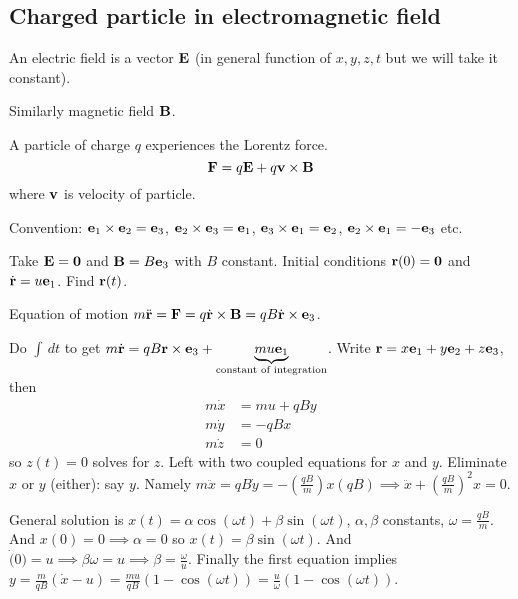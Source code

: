 \documentclass[10pt, a4paper]{article}
\begin{document}
\section{}


\subsection{Charged particle in electromagnetic field}

\begin{definition}
    An electric field is a vector $\mathbf{E}$
    (in general function of $x, y, z, t$ but we will take it constant).
\end{definition}

Similarly magnetic field $\mathbf{B}$.

A particle of charge $q$ experiences the Lorentz force.
\[
\mathbf{F} = q\mathbf{E} + q\mathbf{v} \times \mathbf{B}
\]
where $\mathbf{v}$ is velocity of particle.

Convention:
$\mathbf{e}_1 \times \mathbf{e}_2 = \mathbf{e}_3$,
$\mathbf{e}_2 \times \mathbf{e}_3 = \mathbf{e}_1$,
$\mathbf{e}_3 \times \mathbf{e}_1 = \mathbf{e}_2$,
$\mathbf{e}_2 \times \mathbf{e}_1 = -\mathbf{e}_3$ etc.

\begin{example}
    Take $\mathbf{E} = \mathbf{0}$ and $\mathbf{B} = B\mathbf{e}_3$ with $B$ constant.
    Initial conditions $\mathbf{r}(0) = \mathbf{0}$ and $\dot{\mathbf{r}} = u\mathbf{e}_1$.
    Find $\mathbf{r}(t)$.

    \begin{solution}
        Equation of motion $m\ddot{\mathbf{r}} = \mathbf{F} = q\dot{\mathbf{r}} \times \mathbf{B} = qB \dot{\mathbf{r}} \times \mathbf{e}_3$.

        Do $\int\,dt$ to get $m\dot{\mathbf{r}} = qB\mathbf{r} \times \mathbf{e}_3 + \underbrace{mu\mathbf{e}_1}_{\text{constant of integration}}$.
        Write $\mathbf{r} = x\mathbf{e}_1 + y\mathbf{e}_2 + z\mathbf{e}_3$,
        then
        \begin{align*}
            m\dot{x} &= mu + qBy \\
            m\dot{y} &= -qBx \\
            m\dot{z} &= 0
        \end{align*}
        so $z(t) = 0$ solves for $z$.
        Left with two coupled equations for $x$ and $y$.
        Eliminate $x$ or $y$
        (either):
        say $y$.
        Namely $m\ddot{x} = qB\dot{y} = -\left(\frac{qB}{m}\right)x(qB) \implies \ddot{x} + \left(\frac{qB}{m}\right) ^ 2x = 0$.

        General solution is $x(t) = \alpha\cos(\omega t) + \beta\sin(\omega t)$,
        $\alpha, \beta$ constants,
        $\omega = \frac{qB}{m}$.
        And $x(0) = 0 \implies \alpha = 0$ so $x(t) = \beta\sin(\omega t)$.
        And $\dot(0) = u \implies \beta\omega = u \implies \beta = \frac{\omega}{u}$.
        Finally the first equation implies $y = \frac{m}{qB}(\dot{x} - u) = \frac{mu}{qB}(1 - \cos(\omega t)) = \frac{u}{\omega}(1 - \cos(\omega t))$.
    \end{solution}
\end{example}
\end{document}
